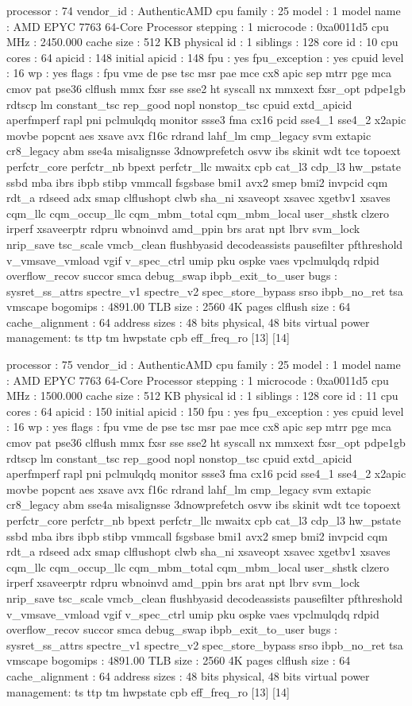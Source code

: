 processor	: 74
vendor_id	: AuthenticAMD
cpu family	: 25
model		: 1
model name	: AMD EPYC 7763 64-Core Processor
stepping	: 1
microcode	: 0xa0011d5
cpu MHz		: 2450.000
cache size	: 512 KB
physical id	: 1
siblings	: 128
core id		: 10
cpu cores	: 64
apicid		: 148
initial apicid	: 148
fpu		: yes
fpu_exception	: yes
cpuid level	: 16
wp		: yes
flags		: fpu vme de pse tsc msr pae mce cx8 apic sep mtrr pge mca cmov pat pse36 clflush mmx fxsr sse sse2 ht syscall nx mmxext fxsr_opt pdpe1gb rdtscp lm constant_tsc rep_good nopl nonstop_tsc cpuid extd_apicid aperfmperf rapl pni pclmulqdq monitor ssse3 fma cx16 pcid sse4_1 sse4_2 x2apic movbe popcnt aes xsave avx f16c rdrand lahf_lm cmp_legacy svm extapic cr8_legacy abm sse4a misalignsse 3dnowprefetch osvw ibs skinit wdt tce topoext perfctr_core perfctr_nb bpext perfctr_llc mwaitx cpb cat_l3 cdp_l3 hw_pstate ssbd mba ibrs ibpb stibp vmmcall fsgsbase bmi1 avx2 smep bmi2 invpcid cqm rdt_a rdseed adx smap clflushopt clwb sha_ni xsaveopt xsavec xgetbv1 xsaves cqm_llc cqm_occup_llc cqm_mbm_total cqm_mbm_local user_shstk clzero irperf xsaveerptr rdpru wbnoinvd amd_ppin brs arat npt lbrv svm_lock nrip_save tsc_scale vmcb_clean flushbyasid decodeassists pausefilter pfthreshold v_vmsave_vmload vgif v_spec_ctrl umip pku ospke vaes vpclmulqdq rdpid overflow_recov succor smca debug_swap ibpb_exit_to_user
bugs		: sysret_ss_attrs spectre_v1 spectre_v2 spec_store_bypass srso ibpb_no_ret tsa vmscape
bogomips	: 4891.00
TLB size	: 2560 4K pages
clflush size	: 64
cache_alignment	: 64
address sizes	: 48 bits physical, 48 bits virtual
power management: ts ttp tm hwpstate cpb eff_freq_ro [13] [14]

processor	: 75
vendor_id	: AuthenticAMD
cpu family	: 25
model		: 1
model name	: AMD EPYC 7763 64-Core Processor
stepping	: 1
microcode	: 0xa0011d5
cpu MHz		: 1500.000
cache size	: 512 KB
physical id	: 1
siblings	: 128
core id		: 11
cpu cores	: 64
apicid		: 150
initial apicid	: 150
fpu		: yes
fpu_exception	: yes
cpuid level	: 16
wp		: yes
flags		: fpu vme de pse tsc msr pae mce cx8 apic sep mtrr pge mca cmov pat pse36 clflush mmx fxsr sse sse2 ht syscall nx mmxext fxsr_opt pdpe1gb rdtscp lm constant_tsc rep_good nopl nonstop_tsc cpuid extd_apicid aperfmperf rapl pni pclmulqdq monitor ssse3 fma cx16 pcid sse4_1 sse4_2 x2apic movbe popcnt aes xsave avx f16c rdrand lahf_lm cmp_legacy svm extapic cr8_legacy abm sse4a misalignsse 3dnowprefetch osvw ibs skinit wdt tce topoext perfctr_core perfctr_nb bpext perfctr_llc mwaitx cpb cat_l3 cdp_l3 hw_pstate ssbd mba ibrs ibpb stibp vmmcall fsgsbase bmi1 avx2 smep bmi2 invpcid cqm rdt_a rdseed adx smap clflushopt clwb sha_ni xsaveopt xsavec xgetbv1 xsaves cqm_llc cqm_occup_llc cqm_mbm_total cqm_mbm_local user_shstk clzero irperf xsaveerptr rdpru wbnoinvd amd_ppin brs arat npt lbrv svm_lock nrip_save tsc_scale vmcb_clean flushbyasid decodeassists pausefilter pfthreshold v_vmsave_vmload vgif v_spec_ctrl umip pku ospke vaes vpclmulqdq rdpid overflow_recov succor smca debug_swap ibpb_exit_to_user
bugs		: sysret_ss_attrs spectre_v1 spectre_v2 spec_store_bypass srso ibpb_no_ret tsa vmscape
bogomips	: 4891.00
TLB size	: 2560 4K pages
clflush size	: 64
cache_alignment	: 64
address sizes	: 48 bits physical, 48 bits virtual
power management: ts ttp tm hwpstate cpb eff_freq_ro [13] [14]


